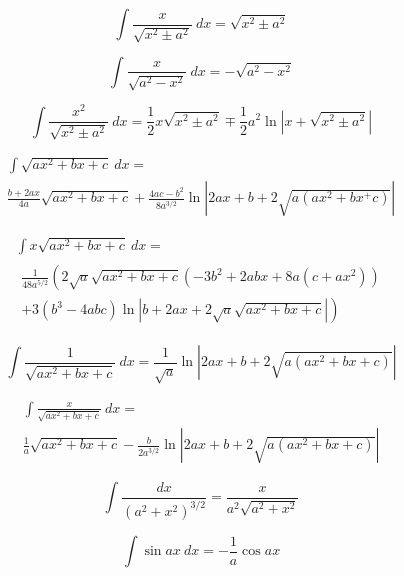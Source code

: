 \begin{equation*}
\int \frac{x}{\sqrt{x^2\pm a^2}}\ dx = \sqrt{x^2 \pm a^2} 
\end{equation*}

\begin{equation*}
\int \frac{x}{\sqrt{a^2-x^2}}\ dx = -\sqrt{a^2-x^2} 
\end{equation*}

\begin{equation*}\label{eq:Russ}
\int \frac{x^2}{\sqrt{x^2 \pm a^2}}\ dx = \frac{1}{2}x\sqrt{x^2 \pm a^2}
\mp \frac{1}{2}a^2 \ln \left| x + \sqrt{x^2\pm a^2} \right | 
\end{equation*}

\begin{multline*}\label{eq:Winokur1}
\int \sqrt{a x^2 + b x + c}\ dx = \\
\frac{b+2ax}{4a}\sqrt{ax^2+bx+c}
+
\frac{4ac-b^2}{8a^{3/2}}\ln \left| 2ax + b + 2\sqrt{a(ax^2+bx^+c)}\right |
\end{multline*}

\begin{multline*}%
\int x \sqrt{a x^2 + bx + c}\ dx = \\
\begin{split}
\frac{1}{48a^{5/2}}\left ( 
2 \sqrt{a} \sqrt{ax^2+bx+c}
\right .  
 \left( - 3b^2 + 2 abx + 8 a(c+ax^2) \right)
\\ \left.
+ 3(b^3-4abc)\ln \left|b + 2ax + 2\sqrt{a}\sqrt{ax^2+bx+c} \right| \right)
\end{split}
\end{multline*}

\begin{equation*}
\int\frac{1}{\sqrt{ax^2+bx+c}}\ dx=
\frac{1}{\sqrt{a}}\ln \left| 2ax+b + 2 \sqrt{a(ax^2+bx+c)} \right | 
\end{equation*}

\begin{multline*}\label{eq:Duley}
\int \frac{x}{\sqrt{ax^2+bx+c}}\ dx=\\
\frac{1}{a}\sqrt{ax^2+bx + c} 
-
\frac{b}{2a^{3/2}}\ln \left| 2ax+b + 2 \sqrt{a(ax^2+bx+c)} \right |
\end{multline*}

\begin{equation*}\label{eq:Winokur2}
\int\frac{dx}{(a^2+x^2)^{3/2}}=\frac{x}{a^2\sqrt{a^2+x^2}}
\end{equation*}

\begin{equation*}
\int \sin ax \ dx = -\frac{1}{a} \cos ax 
\end{equation*}

